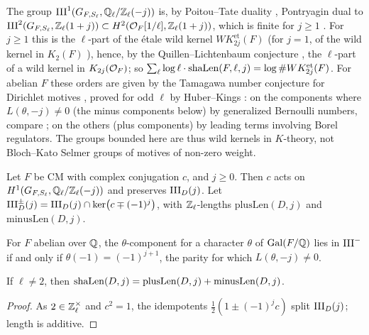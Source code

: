 \begin{remark}\label{rem:window:meaning}
The group $\mathrm{III}^1(G_{F,S_\ell},\mathbb{Q}_\ell/\mathbb{Z}_\ell(-j))$ is, by Poitou--Tate duality \cite{NeukirchSchmidtWingberg2008,Milne2006},
Pontryagin dual to $\mathrm{III}^2(G_{F,S_\ell},\mathbb{Z}_\ell(1+j))\subset H^2(\mathcal{O}_F[1/\ell],\mathbb{Z}_\ell(1+j))$, which is finite for $j\ge1$
\cite{Soule1979}. For $j\ge1$ this is the $\ell$-part of the \'etale wild kernel $WK^{\mathrm{et}}_{2j}(F)$
\cite{Banaszak1993} (for $j=1$, of the wild kernel in $K_2(F)$ \cite{Tate1976}), hence, by the Quillen--Lichtenbaum
conjecture \cite{Voevodsky2011}, the $\ell$-part of a wild kernel in $K_{2j}(\mathcal{O}_F)$; so
$\sum_\ell\log\ell\cdot\mathrm{shaLen}(F,\ell,j)=\log\#WK^{\mathrm{et}}_{2j}(F)$. For abelian $F$ these orders are given by
the Tamagawa number conjecture for Dirichlet motives \cite{BlochKato1990}, proved for odd $\ell$ by Huber--Kings
\cite{HuberKings2003}: on the components where $L(\theta,-j)\ne0$ (the minus components below) by generalized
Bernoulli numbers, compare \cite{MazurWiles1984,CoatesSinnott1974}; on the others (plus components) by leading terms
involving Borel regulators. The groups bounded here are thus wild kernels in $K$-theory, not Bloch--Kato Selmer
groups of motives of non-zero weight.
\end{remark}

\begin{definition}\label{def:window:pm}
Let $F$ be CM with complex conjugation $c$, and $j\ge0$. Then $c$ acts on $H^1(G_{F,S_\ell},\mathbb{Q}_\ell/\mathbb{Z}_\ell(-j))$ and
preserves $\mathrm{III}_D(j)$. Let $\mathrm{III}^\pm_D(j)=\mathrm{III}_D(j)\cap\ker\bigl(c\mp(-1)^{j}\bigr)$, with $\mathbb{Z}_\ell$-lengths
$\mathrm{plusLen}(D,j)$ and $\mathrm{minusLen}(D,j)$.
\end{definition}

For $F$ abelian over $\mathbb{Q}$, the $\theta$-component for a character $\theta$ of $\operatorname{Gal}(F/\mathbb{Q})$ lies in $\mathrm{III}^-$ if and
only if $\theta(-1)=(-1)^{j+1}$, the parity for which $L(\theta,-j)\ne0$.

\begin{lemma}\label{lem:window:pm}
If $\ell\ne2$, then $\mathrm{shaLen}(D,j)=\mathrm{plusLen}(D,j)+\mathrm{minusLen}(D,j)$.
\end{lemma}

\begin{proof}
As $2\in\mathbb{Z}_\ell^\times$ and $c^2=1$, the idempotents $\frac12(1\pm(-1)^jc)$ split $\mathrm{III}_D(j)$; length is additive.
\end{proof}

